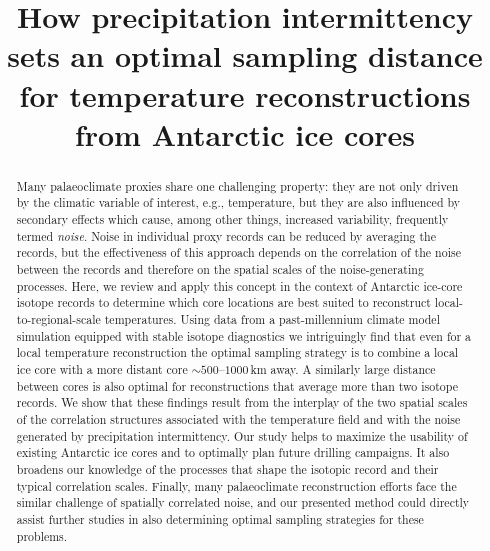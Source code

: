 \documentclass[cp]{copernicus}
\begin{document}
\title{How precipitation intermittency sets an optimal sampling distance for
  temperature reconstructions from Antarctic ice cores}




\received{}
\pubdiscuss{}
\revised{}
\accepted{}
\published{}


\maketitle

\begin{abstract} Many palaeoclimate proxies share one challenging property: they
are not only driven by the climatic variable of interest, e.g., temperature, but
they are also influenced by secondary effects which cause, among other things,
increased variability, frequently termed \emph{noise}. Noise in individual proxy
records can be reduced by averaging the records, but the effectiveness of this
approach depends on the correlation of the noise between the records and
therefore on the spatial scales of the noise-generating processes. Here, we
review and apply this concept in the context of Antarctic ice-core isotope
records to determine which core locations are best suited to reconstruct
local- to-regional-scale temperatures. Using data from a past-millennium climate
model simulation equipped with stable isotope diagnostics we intriguingly find
that even for a local temperature reconstruction the optimal sampling strategy
is to combine a local ice core with a more distant core $\sim500$--$1000$\,km
away. A similarly large distance between cores is also optimal for
reconstructions that average more than two isotope records. We show that these
findings result from the interplay of the two spatial scales of the correlation
structures associated with the temperature field and with the noise generated by
precipitation intermittency. Our study helps to maximize the usability of
existing Antarctic ice cores and to optimally plan future drilling campaigns. It
also broadens our knowledge of the processes that shape the isotopic record and
their typical correlation scales. Finally, many palaeoclimate reconstruction
efforts face the similar challenge of spatially correlated noise, and our
presented method could directly assist further studies in also determining
optimal sampling strategies for these problems.
\end{abstract}
\end{document}
